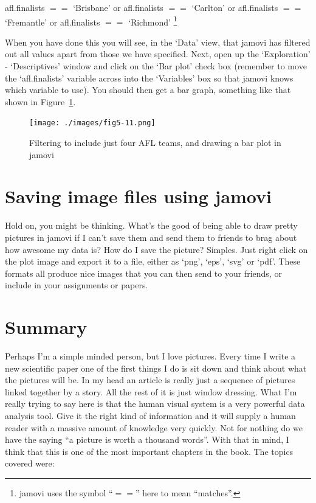 \documentclass[
  letterpaper,
]{book}
\begin{document}
afl.finalists \(==\) `Brisbane' or afl.finalists \(==\) `Carlton' or
afl.finalists \(==\) `Fremantle' or afl.finalists \(==\) `Richmond'
\footnote{jamovi uses the symbol ``\(==\)'' here to mean ``matches''.}

When you have done this you will see, in the `Data' view, that jamovi
has filtered out all values apart from those we have specified. Next,
open up the `Exploration' - `Descriptives' window and click on the `Bar
plot' check box (remember to move the `afl.finalists' variable across
into the `Variables' box so that jamovi knows which variable to use).
You should then get a bar graph, something like that shown in
Figure~\ref{fig-fig5-11}.

\begin{figure}

\texttt{[image: ./images/fig5-11.png]} \hfill{}

\caption{\label{fig-fig5-11}Filtering to include just four AFL teams,
and drawing a bar plot in jamovi}

\end{figure}

\hypertarget{saving-image-files-using-jamovi}{%
\section{Saving image files using
jamovi}\label{saving-image-files-using-jamovi}}

Hold on, you might be thinking. What's the good of being able to draw
pretty pictures in jamovi if I can't save them and send them to friends
to brag about how awesome my data is? How do I save the picture?
Simples. Just right click on the plot image and export it to a file,
either as `png', `eps', `svg' or `pdf'. These formats all produce nice
images that you can then send to your friends, or include in your
assignments or papers.

\hypertarget{summary-1}{%
\section{Summary}\label{summary-1}}

Perhaps I'm a simple minded person, but I love pictures. Every time I
write a new scientific paper one of the first things I do is sit down
and think about what the pictures will be. In my head an article is
really just a sequence of pictures linked together by a story. All the
rest of it is just window dressing. What I'm really trying to say here
is that the human visual system is a very powerful data analysis tool.
Give it the right kind of information and it will supply a human reader
with a massive amount of knowledge very quickly. Not for nothing do we
have the saying ``a picture is worth a thousand words''. With that in
mind, I think that this is one of the most important chapters in the
book. The topics covered were:
\end{document}
